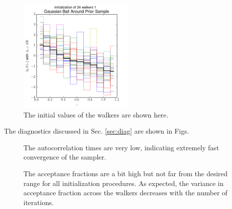 \documentclass[preprint]{aastex}
\begin{document}
\begin{figure}
\includegraphics[width=0.5\textwidth]{real/initializations.png}
\caption{The initial values of the walkers are shown here.}
\label{fig:realival}
\end{figure}





The diagnostics discussed in Sec. \ref{sec:diag} are shown in Figs. %

\begin{figure}
\caption{The autocorrelation times are very low, indicating extremely fast convergence of the sampler.}
\label{fig:realacor}
\end{figure}

\begin{figure}
\caption{The acceptance fractions are a bit high but not far from the desired range for all initialization procedures.  As expected, the variance in acceptance fraction across the walkers decreases with the number of iterations.}
\label{fig:realfrac}
\end{figure}
\end{document}
